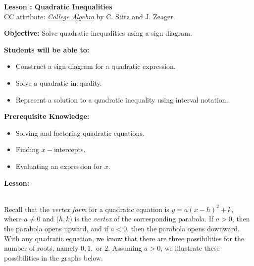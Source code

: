 \documentclass[12pt]{article}
\theoremstyle{definition}
\begin{document}
{\bf \large Lesson : Quadratic Inequalities}
\\ CC attribute: \href{http://www.stitz-zeager.com}{\it{College Algebra}} by C. Stitz and J. Zeager. 
\hfill \doclicenseImage[imagewidth=5em]\\
\par
{\bf Objective:} Solve quadratic inequalities using a sign diagram.\\
\par
{\bf Students will be able to:}
\begin{itemize}
	\item Construct a sign diagram for a quadratic expression.
	\item Solve a quadratic inequality.
	\item Represent a solution to a quadratic inequality using interval notation.
\end{itemize}
{\bf Prerequisite Knowledge:}
\begin{itemize}
	\item Solving and factoring quadratic equations.
	\item Finding $x-$intercepts.
	\item Evaluating an expression for $x$.
\end{itemize}
\hrulefill

{\bf Lesson:}\\
\ \par
Recall that the {\it vertex form} for a quadratic equation is $y=a(x-h)^2+k,$ where $a\neq 0$ and ($h,k$) is the {\it vertex} of the corresponding parabola.  If $a>0$, then the parabola opens upward, and if $a<0$, then the parabola opens downward.  With any quadratic equation, we know that there are three possibilities for the number of roots, namely $0,1,$ or $2$.  Assuming $a>0$, we illustrate these possibilities in the graphs below.

\begin{center}
\end{center}
\end{document}
